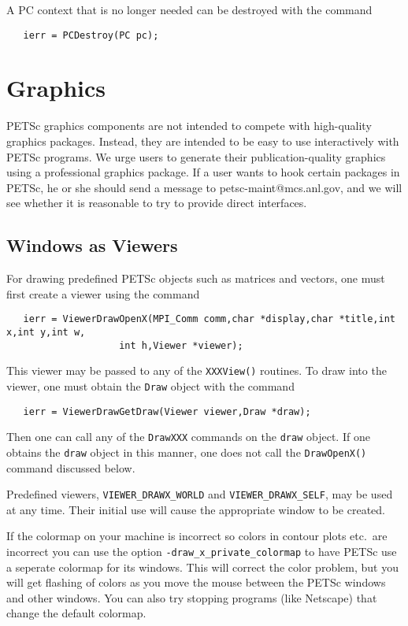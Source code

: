 A PC context that is no longer needed can be destroyed with the 
command 
\begin{verbatim}
   ierr = PCDestroy(PC pc);
\end{verbatim}

\chapter{Graphics}
\label{ch:graphics}


PETSc graphics components are not intended to compete with 
high-quality graphics packages.  Instead, they are intended to be 
easy to use interactively with PETSc programs. We urge users
to generate their publication-quality graphics using a
professional graphics package. If a user wants to hook
certain packages in PETSc, he or she should send a message to 
petsc-maint@mcs.anl.gov, and we will see whether it is reasonable
to try to provide direct interfaces.

\section{Windows as Viewers}
For drawing predefined PETSc objects such as matrices and vectors, one must 
first create a viewer using the 
command 
\begin{verbatim}
   ierr = ViewerDrawOpenX(MPI_Comm comm,char *display,char *title,int x,int y,int w,
                    int h,Viewer *viewer);
\end{verbatim}
This viewer may be passed to any of the {\tt XXXView()} routines.
To draw into the viewer, one must obtain the {\tt Draw} object with the
command 
\begin{verbatim}
   ierr = ViewerDrawGetDraw(Viewer viewer,Draw *draw);
\end{verbatim}
Then one can call any of the {\tt DrawXXX} commands on the {\tt draw}
object. If one obtains the {\tt draw} object in this manner, 
one does not call the {\tt DrawOpenX()} command discussed below.

  
Predefined viewers, {\tt VIEWER\_DRAWX\_WORLD} 
and {\tt VIEWER\_DRAWX\_SELF}, may be used at any time. Their initial
use will cause the appropriate window to be created.

\medskip
If the colormap on your machine is incorrect so colors in contour plots
etc.~are incorrect you can use the option {\tt -draw\_x\_private\_colormap}
 to have PETSc use a seperate colormap
for its windows. This will correct the color problem, but you will get
flashing of colors as you move the mouse between the PETSc windows and other 
windows. You can also try stopping programs (like Netscape) that change the 
default colormap.

